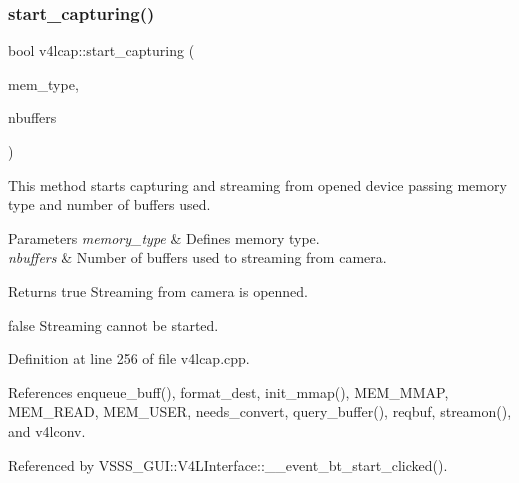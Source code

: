 \subsubsection{\texorpdfstring{start\+\_\+capturing()}{start\_capturing()}\hspace{0.1cm}{\footnotesize\ttfamily [1/2]}}
{\footnotesize\ttfamily bool v4lcap\+::start\+\_\+capturing (\begin{DoxyParamCaption}\item[{enum \hyperlink{classv4lcap_aae799230441b7965d8947b104d8d753e}{memory\+\_\+type}}]{mem\+\_\+type,  }\item[{int}]{nbuffers }\end{DoxyParamCaption})}



This method starts capturing and streaming from opened device passing memory type and number of buffers used. 


\begin{DoxyParams}{Parameters}
{\em memory\+\_\+type} & Defines memory type. \\
\hline
{\em nbuffers} & Number of buffers used to streaming from camera. \\
\hline
\end{DoxyParams}
\begin{DoxyReturn}{Returns}
true Streaming from camera is openned. 

false Streaming cannot be started. 
\end{DoxyReturn}


Definition at line 256 of file v4lcap.\+cpp.



References enqueue\+\_\+buff(), format\+\_\+dest, init\+\_\+mmap(), M\+E\+M\+\_\+\+M\+M\+AP, M\+E\+M\+\_\+\+R\+E\+AD, M\+E\+M\+\_\+\+U\+S\+ER, needs\+\_\+convert, query\+\_\+buffer(), reqbuf, streamon(), and v4lconv.



Referenced by V\+S\+S\+S\+\_\+\+G\+U\+I\+::\+V4\+L\+Interface\+::\+\_\+\+\_\+event\+\_\+bt\+\_\+start\+\_\+clicked().


